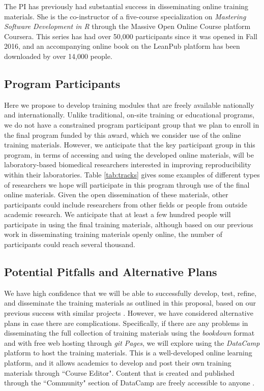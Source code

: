 \documentclass[pdftex,english,11.5pt,parskip=half]{scrartcl}
\begin{document}
The PI has previously had substantial success in disseminating online training materials. She is the co-instructor of a five-course specialization on \textit{Mastering Software Development in R} through the Massive Open Online Course platform Coursera. This series has had over 50,000 participants since it was opened in Fall 2016, and an accompanying online book on the LeanPub platform has been downloaded by over 14,000 people.

\subsection{Program Participants}

Here we propose to develop training modules that are freely available nationally and internationally. Unlike traditional, on-site training or educational programs, we do not have a constrained program participant group that we plan to enroll in the final program funded by this award, which we consider use of the online training materials. However, we anticipate that the key participant group in this program, in terms of accessing and using the developed online materials, will be laboratory-based biomedical researchers interested in improving reproducibility within their laboratories. Table \ref*{tab:tracks} gives some examples of different types of researchers we hope will participate in this program through use of the final online materials. Given the open dissemination of these materials, other participants could include researchers from other fields or people from outside academic research. We anticipate that at least a few hundred people will participate in using the final training materials, although based on our previous work in disseminating training materials openly online, the number of participants could reach several thousand.

\subsection{Potential Pitfalls and Alternative Plans}

We have high confidence that we will be able to successfully develop, test, refine, and disseminate the training materials as outlined in this proposal, based on our previous success with similar projects \cite{andersonmastering, andersoncoursebook}. However, we have considered alternative plans in case there are complications. Specifically, if there are any problems in disseminating the full collection of training materials using the \textit{bookdown} format and with free web hosting through \textit{git Pages}, we will explore using the \textit{DataCamp} platform \cite{datacamp} to host the training materials. This is a well-developed online learning platform, and it allows academics to develop and post their own training materials through ``Course Editor". Content that is created and published through the ``Community" section of DataCamp are freely accessible to anyone \cite{authoringdatacamp}.  
\end{document}
